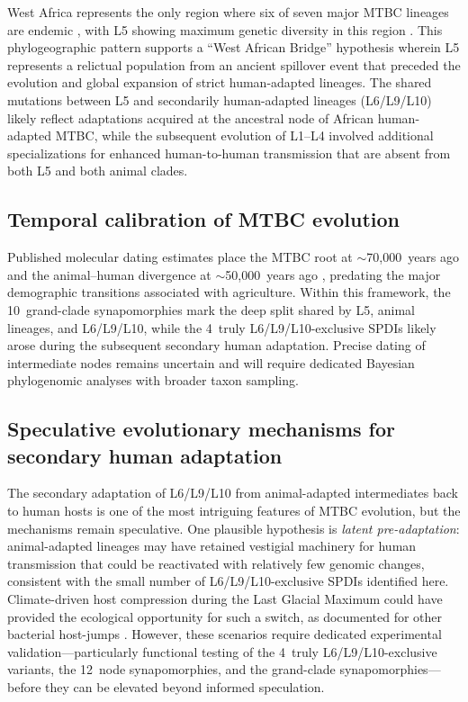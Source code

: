 \documentclass[11pt,a4paper]{article}
\begin{document}
West Africa represents the only region where six of seven major MTBC lineages
are endemic \cite{YeboahManu2017}, with L5 showing maximum genetic diversity
in this region \cite{Gehre2013}. This phylogeographic pattern supports a
``West African Bridge'' hypothesis wherein L5 represents a relictual population
from an ancient spillover event that preceded the evolution and global expansion
of strict human-adapted lineages. The shared mutations between L5 and
secondarily human-adapted lineages (L6/L9/L10) likely reflect adaptations
acquired at the
ancestral node of African human-adapted MTBC, while the subsequent evolution
of L1--L4 involved additional specializations for enhanced human-to-human
transmission that are absent from both L5 and both animal clades.

\subsection{Temporal calibration of MTBC evolution}
\label{sec:disc:temporal}

Published molecular dating estimates place the MTBC root at
$\sim$70{,}000~years ago and the animal--human divergence at
$\sim$50{,}000~years ago \cite{Comas2013}, predating the major demographic
transitions associated with agriculture. Within this framework, the
10~grand-clade synapomorphies mark the deep split shared by L5, animal
lineages, and L6/L9/L10, while the 4~truly L6/L9/L10-exclusive SPDIs likely
arose during the subsequent secondary human adaptation. Precise dating of
intermediate nodes remains uncertain and will require dedicated Bayesian
phylogenomic analyses with broader taxon sampling.

\subsection{Speculative evolutionary mechanisms for secondary human adaptation}
\label{sec:disc:reemergence_mechanisms}

The secondary adaptation of L6/L9/L10 from animal-adapted intermediates back
to human hosts is one of the most intriguing features of MTBC evolution, but
the mechanisms remain speculative. One plausible hypothesis is \emph{latent
pre-adaptation}: animal-adapted lineages may have retained vestigial machinery
for human transmission that could be reactivated with relatively few genomic
changes, consistent with the small number of L6/L9/L10-exclusive SPDIs
identified here. Climate-driven host compression during the Last Glacial
Maximum could have provided the ecological opportunity for such a switch, as
documented for other bacterial host-jumps \cite{Spyrou2022}. However, these
scenarios require dedicated experimental validation---particularly functional
testing of the 4~truly L6/L9/L10-exclusive variants, the 12~node
synapomorphies, and the grand-clade synapomorphies---before they can be
elevated beyond informed speculation.
\end{document}
